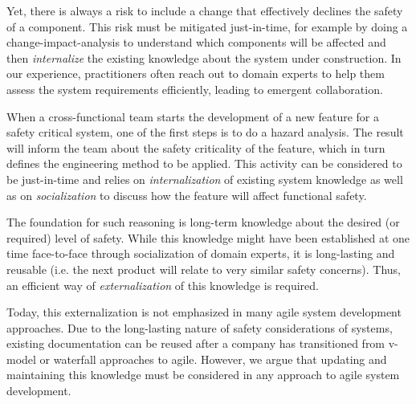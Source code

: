 Yet, there is always a risk to include a change %
that effectively declines the safety of a component.
This risk must be mitigated just-in-time, for example by doing a change-impact-analysis to understand which components will be affected and then \emph{internalize} the existing knowledge about the system under construction.
In our experience, practitioners often reach out to domain experts to help them assess the system requirements efficiently, leading to emergent collaboration.

When a cross-functional team starts the development of a new feature for a safety critical system, one of the first steps is to do a hazard analysis. 
The result will inform the team about the safety criticality of the feature, which in turn defines the engineering method to be applied. 
This activity can be considered to be just-in-time and relies on \emph{internalization} of existing system knowledge as well as on \emph{socialization} to discuss how the feature will affect functional safety.%

The foundation for such reasoning is long-term knowledge about the desired (or required) level of safety. 
While this knowledge might have been established at one time face-to-face through socialization of domain experts, it is long-lasting and reusable (i.e. the next product will relate to very similar safety concerns). 
Thus, an efficient way of \emph{externalization} of this knowledge is required. 

Today, this externalization is not emphasized in many agile system development approaches.
Due to the long-lasting nature of safety considerations of systems, existing documentation can be reused after a company has transitioned from v-model or waterfall approaches to agile. 
However, we argue that updating and maintaining this knowledge must be considered in any approach to agile system development.